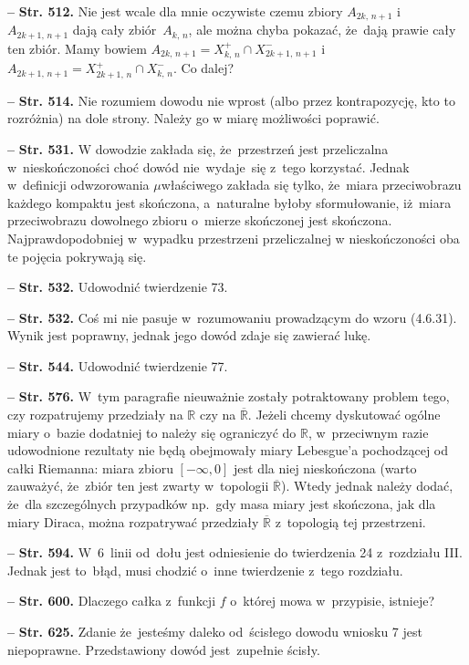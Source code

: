 \documentclass[a4paper]{article}
\newcommand{\tb}{\textbf}
\newcommand{\noi}{\noindent}
\newcommand{\start}{\noi \tb{--} {}}
\newcommand{\Str}[1]{\tb{Str. #1.}}
\begin{document}
\start \Str{512} Nie jest wcale dla mnie oczywiste czemu zbiory
$A_{ 2 k,\, n+ 1 }$ i~$A_{ 2 k + 1,\, n+ 1 }$ dają cały
zbiór~$A_{ k,\, n }$, ale można chyba pokazać, że~dają prawie cały ten
zbiór. Mamy bowiem
$A_{ 2 k,\, n + 1 } = X^{ + }_{ k,\, n } \cap X^{ - }_{ 2 k + 1,\, n +
  1 }$ i
$A_{ 2 k + 1,\, n + 1 } = X^{ + }_{ 2 k + 1,\, n } \cap X^{ - }_{ k,\,
  n }$. Co dalej?
  
\start \Str{514} Nie rozumiem dowodu nie wprost (albo przez
kontrapozycję, kto to rozróżnia) na dole strony. Należy go w miarę
możliwości poprawić.
  
\start \Str{531} W dowodzie zakłada się, że~przestrzeń jest
przeliczalna w~nieskończoności choć dowód nie~wydaje~się z~tego
korzystać. Jednak w~definicji odwzorowania $\mu$\dywiz właściwego
zakłada się tylko, że~miara przeciwobrazu każdego kompaktu jest
skończona, a~naturalne byłoby sformułowanie, iż~miara przeciwobrazu
dowolnego zbioru o~mierze skończonej jest skończona.
Najprawdopodobniej w~wypadku przestrzeni przeliczalnej w
nieskończoności oba te pojęcia pokrywają się.
  
\start \Str{532} Udowodnić twierdzenie 73.
  
\start \Str{532} Coś mi nie pasuje w~rozumowaniu prowadzącym do wzoru
(4.6.31). Wynik jest poprawny, jednak jego dowód zdaje się zawierać
lukę.
  
\start \Str{544} Udowodnić twierdzenie 77.

\start \Str{576} W~tym paragrafie nieuważnie zostały potraktowany
problem tego, czy rozpatrujemy przedziały na $\mathbb{R}$ czy na
$\overline{\mathbb{R}}$. Jeżeli chcemy dyskutować ogólne miary o~bazie
dodatniej to należy się ograniczyć do $\mathbb{R}$, w~przeciwnym razie
udowodnione rezultaty nie będą obejmowały miary Lebesgue'a pochodzącej
od całki Riemanna: miara zbioru $[-\infty, 0]$ jest dla niej
nieskończona (warto zauważyć, że~zbiór ten jest zwarty w~topologii
$\overline{\mathbb{R}}$). Wtedy jednak należy dodać, że~dla
szczególnych przypadków np.~gdy masa miary jest skończona, jak dla
miary Diraca, można rozpatrywać przedziały $\overline{\mathbb{R}}$
z~topologią tej przestrzeni.

\start \Str{594} W~6~linii od~dołu jest odniesienie do twierdzenia 24
z~rozdziału III. Jednak jest to~błąd, musi chodzić o~inne twierdzenie
z~tego rozdziału.

\start \Str{600} Dlaczego całka z~funkcji $f$ o~której mowa
w~przypisie, istnieje?

\start \Str{625} Zdanie że~jesteśmy daleko od~ścisłego dowodu wniosku
7 jest niepoprawne. Przedstawiony dowód jest~zupełnie ścisły.
  
\end{document}
